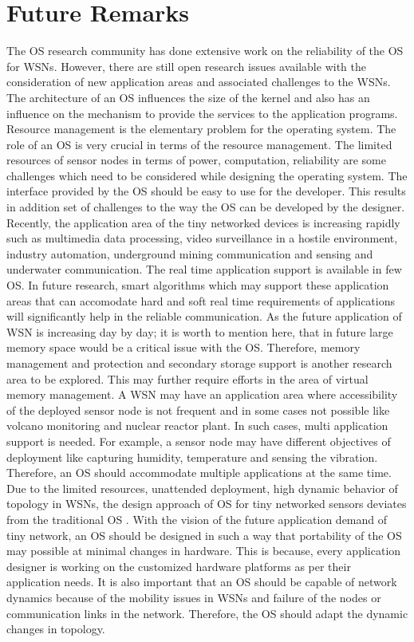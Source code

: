 \documentclass[12pt,journal,communications surveys and tutorials]{IEEEtran}
\begin{document}
\section{Future Remarks}
The OS research community has done extensive work on the reliability of the OS for WSNs. However, there are still open research issues available with the consideration of new application areas and associated challenges to the WSNs. The architecture of an OS influences the size of the kernel and also has an influence on the mechanism to provide the services to the application programs. Resource management is the elementary problem for the operating system. The role of an OS is very crucial in terms of the resource management. The limited resources of sensor nodes in terms of power, computation, reliability are some challenges which need to be considered while designing the operating system. The interface provided by the OS should be easy to use for the developer. This results in addition set of challenges to the way the OS can be developed by the designer. Recently, the application area of the tiny networked devices is increasing rapidly  such as multimedia data processing, video surveillance in a hostile environment, industry automation, underground mining communication and sensing and  underwater communication. The real time application support is available in few OS. In future research, smart algorithms which may support these application areas that can accomodate hard and soft real time requirements of applications will significantly help in the reliable communication. As the future application of WSN is increasing day by day; it is worth to mention here, that in future large memory space would be a critical issue with the OS. Therefore, memory management and protection and secondary storage support is another research area to be explored. This may further require efforts in the area of virtual memory management.  A WSN may have an application area where accessibility of the deployed sensor node is not frequent and in some cases not possible like volcano monitoring and nuclear reactor plant. In such cases, multi application support is needed. For example, a sensor node may have different objectives of deployment like capturing humidity, temperature and sensing the vibration. Therefore, an OS should accommodate multiple applications at the same time. Due to the limited resources, unattended deployment, high dynamic behavior of topology in WSNs, the design approach of OS for tiny networked sensors deviates from the traditional OS \cite{phani2009operating}. With the vision of the future application demand of tiny network, an OS should be designed in such a way that portability of the OS may possible at minimal changes in hardware. This is because, every application designer is working on the customized hardware platforms as per their application needs. It is also important that an OS should be capable of network dynamics because of the mobility issues in WSNs and failure of the nodes or communication links in the network. Therefore, the OS should adapt the dynamic changes in topology.
\end{document}
